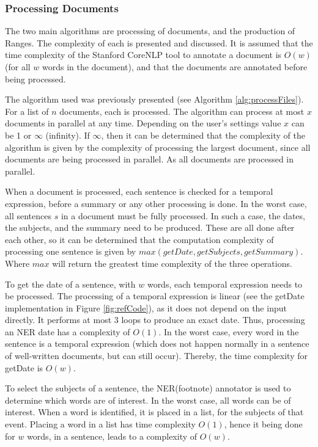 \subsubsection{Processing Documents}
\par The two main algorithms are processing of documents, and the production of Ranges. The complexity of each is presented and discussed. It is assumed that the time complexity of the Stanford CoreNLP tool to annotate a document is $O(w)$ (for all $w$ words in the document), and that the documents are annotated before being processed.

\par The algorithm used was previously presented (see Algorithm \ref{alg:processFiles}). For a list of $n$ documents, each is processed. The algorithm can process at most $x$ documents in parallel at any time. Depending on the user's settings value $x$ can be 1 or $\infty$ (infinity). If $\infty$, then it can be determined that the complexity of the algorithm is given by the complexity of processing the largest document, since all documents are being processed in parallel. As all documents are processed in parallel. 

\par When a document is processed, each sentence is checked for a temporal expression, before a summary or any other processing is done. In the worst case, all sentences $s$ in a document must be fully processed. In such a case, the dates, the subjects, and the summary need to be produced. These are all done after each other, so it can be determined that the computation complexity of processing one sentence is given by $max(getDate, getSubjects, getSummary)$. Where $max$ will return the greatest time complexity of the three operations. 

\par To get the date of a sentence, with $w$ words, each temporal expression needs to be processed. The processing of a temporal expression is linear (see the getDate implementation in Figure \ref{fig:refCode}), as it does not depend on the input directly. It performs at most 3 loops to produce an exact date. Thus, processing an NER date has a complexity of $O(1)$. In the worst case, every word in the sentence is a temporal expression (which does not happen normally in a sentence of well-written documents, but can still occur). Thereby, the time complexity for getDate is $O(w)$.

\par To select the subjects of a sentence, the NER(footnote) annotator is used to determine which words are of interest. In the worst case, all words can be of interest. When a word is identified, it is placed in a list, for the subjects of that event. Placing a word in a list has time complexity $O(1)$, hence it being done for $w$ words, in a sentence, leads to a complexity of $O(w)$.

